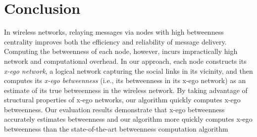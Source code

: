 \section{Conclusion}\label{conclusion}
% 
% 

In wireless networks, relaying messages via nodes with high betweenness centrality improves both the efficiency and reliability of message delivery.
Computing the betweenness of each node, however, incurs impractically high network and computational overhead.
In our approach, each node constructs its {\em x-ego network}, a logical network capturing the social links in its vicinity, and then computes its {\em x-ego betweenness} (i.e., its betweenness in its x-ego network) as an estimate of its true betweenness in the wireless network.
By taking advantage of structural properties of x-ego networks, our algorithm quickly computes x-ego betweenness.
Our evaluation results demonstrate that x-ego betweenness accurately estimates betweenness and our algorithm more quickly computes x-ego betweenness than the state-of-the-art betweenness computation algorithm 
